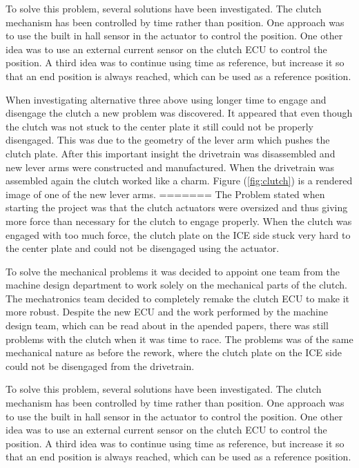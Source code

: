 To solve this problem, several solutions have been investigated. The clutch
mechanism has been controlled by time rather than position. One approach was to
use the built in hall sensor in the actuator to control the position. One other
idea was to use an external current sensor on the clutch ECU to control the
position. A third idea was to continue using time as reference, but increase it
so that an end position is always reached, which can be used as a reference
position.

When investigating alternative three above using longer time to engage and
disengage the clutch a new problem was discovered. It appeared that even though
the clutch was not stuck to the center plate it still could not be properly
disengaged. This was due to the geometry of the lever arm which pushes the
clutch plate.  After this important insight the drivetrain was disassembled and
new lever arms were constructed and manufactured. When the drivetrain was
assembled again the clutch worked like a charm. Figure (\ref{fig:clutch}) is a
rendered image of one of the new lever arms.
=======
The Problem stated when starting the project was that the clutch actuators were oversized and thus giving more force than necessary for the clutch to engage properly. When the clutch was engaged with too much force, the clutch plate on the ICE side stuck very hard to the center plate and could not be disengaged using the actuator.

To solve the mechanical problems it was decided to appoint one team from the machine design department to work solely on the mechanical parts of the clutch. The mechatronics team decided to completely remake the clutch ECU to make it more robust. Despite the new ECU and the work performed by the machine design team, which can be read about in the apended papers, there was still problems with the clutch when it was time to race. The problems was of the same mechanical nature as before the rework, where the clutch plate on the ICE side could not be disengaged from the drivetrain.

To solve this problem, several solutions have been investigated. The clutch mechanism has been controlled by time rather than position. One approach was to use the built in hall sensor in the actuator to control the position. One other idea was to use an external current sensor on the clutch ECU to control the position. A third idea was to continue using time as reference, but increase it so that an end position is always reached, which can be used as a reference position.

